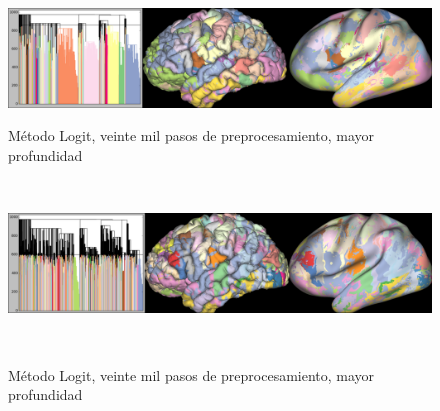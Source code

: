 \begin{figure}[h!]
\begin{minipage}[b]{\textwidth}
\end{minipage} ~

\begin{minipage}[b]{\textwidth}
    \includegraphics[width=\textwidth]{img/all_brain/logit_20000_deep0.png}
    \caption{M\'etodo Logit, veinte mil pasos de preprocesamiento, mayor 
             profundidad}
\end{minipage} ~

\begin{minipage}[b]{\textwidth}
    \includegraphics[width=\textwidth]{img/all_brain/logit_20000_deep1.png}
    \caption{M\'etodo Logit, veinte mil pasos de preprocesamiento, mayor 
             profundidad}
\end{minipage} ~


\end{figure}
